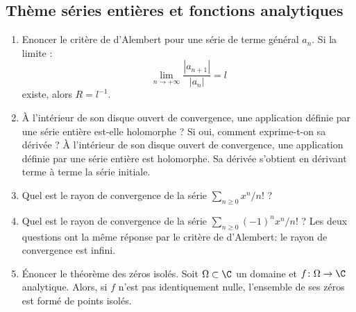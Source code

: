 \documentclass[a4paper, 12pt]{amsart}
\begin{document}
\subsection{Thème séries entières et fonctions analytiques}
\begin{enumerate}
\item Enoncer le critère de d'Alembert pour une série de terme général $a_n$.
Si la limite : 
\[
\lim_{n \to +\infty} \frac{|a_{n+1}|}{|a_n|} = l
\]
existe, alors $R = l^{-1}.$
\item À l'intérieur de son disque ouvert de convergence, une application définie
par une série entière est-elle holomorphe ? Si oui, comment exprime-t-on sa
dérivée ?
À l'intérieur de son disque ouvert de convergence, une application définie par une série entière
est holomorphe. Sa dérivée s'obtient en dérivant terme à terme la série initiale.
\item Quel est le rayon de convergence de la série $\sum_{n \geq 0} x^n / n!$ ?
\item Quel est le rayon de convergence de la série $\sum_{n \geq 0} (-1)^n x^n / n!$ ?
Les deux questions ont la même réponse par le critère de d'Alembert: le rayon de convergence est infini.
\item Énoncer le théorème des zéros isolés.
Soit $\Omega \subset \C$ un domaine et $f \colon \Omega \to \C$ analytique. Alors, si $f$ n'est pas identiquement nulle, l'ensemble de ses
zéros est formé de points isolés.
\end{enumerate}
\end{document}
